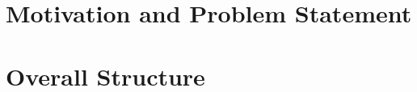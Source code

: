 %


\section{Motivation and Problem Statement}
\label{sec:motivation}

\section{Overall Structure}
\label{sec:structure}